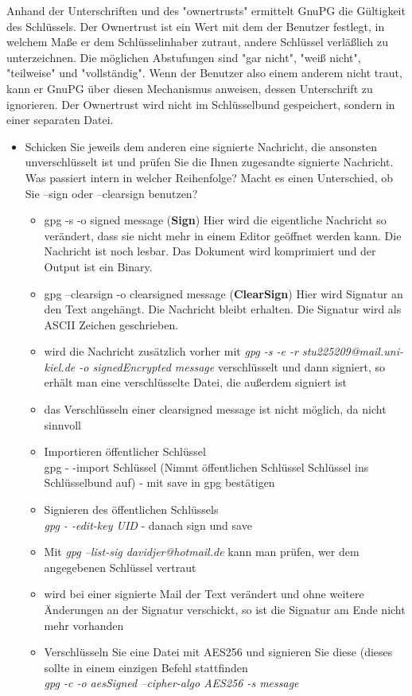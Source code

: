 \documentclass[12pt,a4paper]{article}
\begin{document}
Anhand der Unterschriften und des "ownertrusts" ermittelt GnuPG die Gültigkeit des Schlüssels. Der Ownertrust ist ein Wert mit dem der Benutzer festlegt, in welchem Maße er dem Schlüsselinhaber zutraut, andere Schlüssel verläßlich zu unterzeichnen. Die möglichen Abstufungen sind "gar nicht", "weiß nicht", "teilweise" und "vollständig". Wenn der Benutzer also einem anderem nicht traut, kann er GnuPG über diesen Mechanismus anweisen, dessen Unterschrift zu ignorieren. Der Ownertrust wird nicht im Schlüsselbund gespeichert, sondern in einer separaten Datei.
\begin{itemize}
    \item Schicken Sie jeweils dem anderen eine signierte Nachricht, die ansonsten unverschlüsselt ist und prüfen Sie die Ihnen zugesandte signierte Nachricht. Was passiert intern in welcher Reihenfolge? Macht es einen Unterschied, ob Sie --sign oder --clearsign benutzen?
    \begin{itemize}
        \item gpg -s -o signed message (\textbf{Sign}) Hier wird die eigentliche Nachricht so verändert, dass sie nicht mehr in einem Editor geöffnet werden kann. Die Nachricht ist noch lesbar. Das Dokument wird komprimiert und der Output ist ein Binary.
        \item  gpg --clearsign -o clearsigned message (\textbf{ClearSign}) Hier wird Signatur an den Text angehängt. Die Nachricht bleibt erhalten. Die Signatur wird als ASCII Zeichen geschrieben.
        \item wird die Nachricht zusätzlich vorher mit \textit{gpg -s -e -r stu225209@mail.uni-kiel.de -o signedEncrypted message} verschlüsselt und dann signiert, so erhält man eine verschlüsselte Datei, die außerdem signiert ist
        \item das Verschlüsseln einer clearsigned message ist nicht möglich, da nicht sinnvoll
        \item Importieren öffentlicher Schlüssel\\
gpg - -import Schlüssel (Nimmt öffentlichen Schlüssel Schlüssel ins Schlüsselbund auf) - mit save in gpg bestätigen
        \item Signieren des öffentlichen Schlüssels\\
        \textit{gpg - -edit-key UID} - danach  sign und save
        \item Mit \textit{gpg --list-sig davidjer@hotmail.de} kann man prüfen, wer dem angegebenen Schlüssel vertraut
        \item wird bei einer signierte Mail der Text verändert und ohne weitere Änderungen an der Signatur verschickt, so ist die Signatur am Ende nicht mehr vorhanden
        \item Verschlüsseln Sie eine Datei mit AES256 und signieren Sie diese (dieses sollte in einem einzigen Befehl stattfinden\\
        \textit{gpg -c -o aesSigned --cipher-algo AES256 -s message}
        
    \end{itemize}
    
\end{itemize}
\end{document}
